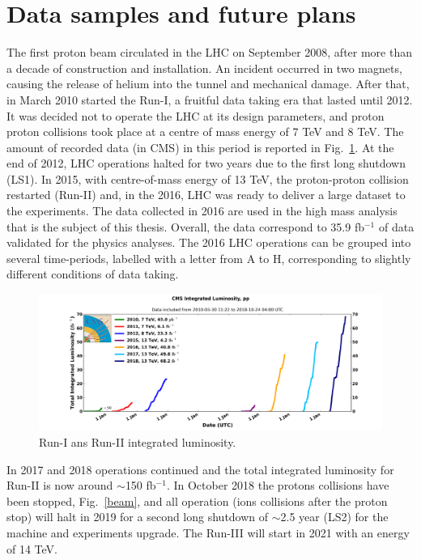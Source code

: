 \section{Data samples and future plans}
The first proton beam circulated in the LHC on September 2008, after more than a decade of construction and installation.
An incident occurred in two magnets, causing the release of helium into the tunnel
and mechanical damage. After that, in March  2010 started the Run-I, a fruitful data taking era that lasted until
2012.  It was decided not to operate the LHC at its design parameters, and proton proton collisions
took place at a centre of mass energy of 7 TeV and 8 TeV. The amount of recorded data (in CMS) in this period is reported in Fig.~\ref{int_lumi_cumulative_pp_1}.
At the end of 2012, LHC operations halted for two years due to the first long shutdown (LS1).
In 2015, with centre-of-mass energy of 13 TeV, the proton-proton collision restarted (Run-II) and, in the 2016,  LHC was ready to deliver a large dataset to the experiments.
The data collected in 2016 are used in the high mass analysis that is
the subject of this thesis. Overall, the data correspond to 35.9
fb$^{-1}$ of data validated for the physics analyses. The 2016 LHC operations can be
grouped into several time-periods,  
labelled with a letter from A to H, corresponding to slightly different conditions of data taking.
\begin{figure}
\centering
\includegraphics[scale= 0.4]{../Cap2/int_lumi_cumulative_pp_1}
\caption{Run-I ans Run-II integrated luminosity.}
\label{int_lumi_cumulative_pp_1}
\end{figure}
In 2017 and 2018 operations continued and the total integrated luminosity for Run-II is now around $\sim$150 fb$^{-1}$. 
In October 2018 the protons collisions have been stopped, Fig.~\ref{beam}, and all operation (ions collisions after the proton stop) will  halt in 2019 for a second long shutdown of $\sim$2.5 year (LS2) for the machine and experiments upgrade. The Run-III will start in 2021 with an energy of 14 TeV.
